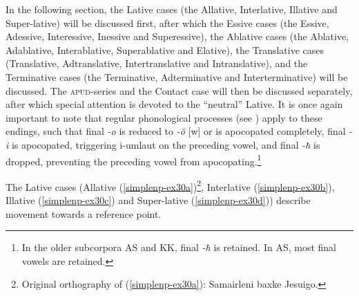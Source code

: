 In the following section, the Lative cases (the Allative, Interlative, Illative and Super-lative) will be discussed first, after which the Essive cases (the Essive, Adessive, Interessive, Inessive and Superessive), the Ablative cases (the Ablative, Adablative, Interablative, Superablative and Elative), the Translative cases (Translative, Adtranslative, Intertranslative and Intranslative), and the Terminative cases (the Terminative, Adterminative and Interterminative) will be discussed. The \textsc{apud}-series and the Contact case will then be discussed separately, after which special attention is devoted to the ``neutral'' Lative. It is once again important to note that regular phonological processes (see ) apply to these endings, such that final \textit{-o} is reduced to \textit{-\u{o}} [w] or is apocopated completely, final \textit{-i} is apocopated, triggering i-umlaut on the preceding vowel, and final \textit{-ħ} is dropped, preventing the preceding vowel from apocopating.\footnote{In the older subcorpora AS and KK, final \textit{-ħ} is retained. In AS, most final vowels are retained.}

The Lative cases (Allative (\ref{simplenp-ex30a})\footnote{Original orthography of (\ref{simplenp-ex30a}): Samairleni baxke Jesuigo.}, Interlative (\ref{simplenp-ex30b}), Illative (\ref{simplenp-ex30c}) and Super-lative (\ref{simplenp-ex30d})) describe movement towards a reference point.

